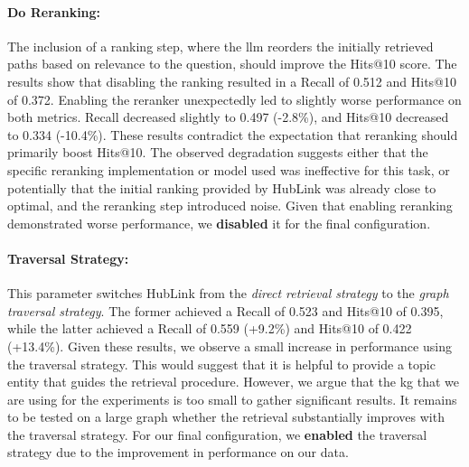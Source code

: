\paragraph{Do Reranking:} 
The inclusion of a ranking step, where the \gls{llm} reorders the initially retrieved paths based on relevance to the question, should improve the Hits@10 score. The results show that disabling the ranking resulted in a Recall of 0.512 and Hits@10 of 0.372. Enabling the reranker unexpectedly led to slightly worse performance on both metrics. Recall decreased slightly to 0.497 (-2.8\%), and Hits@10 decreased to 0.334 (-10.4\%). These results contradict the expectation that reranking should primarily boost Hits@10. The observed degradation suggests either that the specific reranking implementation or model used was ineffective for this task, or potentially that the initial ranking provided by HubLink was already close to optimal, and the reranking step introduced noise. Given that enabling reranking demonstrated worse performance, we \textbf{disabled} it for the final configuration.

\paragraph{Traversal Strategy:} 
This parameter switches HubLink from the \emph{direct retrieval strategy} to the \emph{graph traversal strategy}. The former achieved a Recall of 0.523 and Hits@10 of 0.395, while the latter achieved a Recall of 0.559 (+9.2\%) and Hits@10 of 0.422 (+13.4\%). Given these results, we observe a small increase in performance using the traversal strategy. This would suggest that it is helpful to provide a topic entity that guides the retrieval procedure. However, we argue that the \gls{kg} that we are using for the experiments is too small to gather significant results. It remains to be tested on a large graph whether the retrieval substantially improves with the traversal strategy. For our final configuration, we \textbf{enabled} the traversal strategy due to the improvement in performance on our data.
